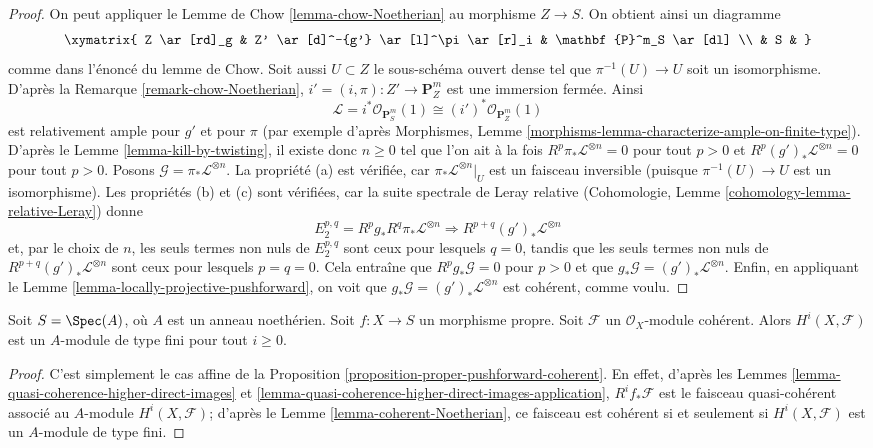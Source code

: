 \begin{proof}
\medskip\noindent
On peut appliquer le Lemme de Chow \ref{lemma-chow-Noetherian}
au morphisme $Z \to S$. On obtient ainsi un diagramme
$$
\xymatrix{
Z \ar[rd]_g & Z' \ar[d]^-{g'} \ar[l]^\pi \ar[r]_i & \mathbf{P}^m_S \ar[dl] \\
& S &
}
$$
comme dans l'énoncé du lemme de Chow. Soit aussi $U \subset Z$
le sous-schéma ouvert dense tel que $\pi^{-1}(U) \to U$ soit un isomorphisme.
D'après la Remarque \ref{remark-chow-Noetherian},
$i' = (i, \pi) : Z' \to \mathbf{P}^m_Z$ est
une immersion fermée. Ainsi
$$
\mathcal{L} = i^*\mathcal{O}_{\mathbf{P}^m_S}(1) \cong
(i')^*\mathcal{O}_{\mathbf{P}^m_Z}(1)
$$
est relativement ample pour $g'$ et pour $\pi$ (par exemple d'après
Morphismes, Lemme \ref{morphisms-lemma-characterize-ample-on-finite-type}).
D'après le Lemme \ref{lemma-kill-by-twisting},
il existe donc $n \geq 0$ tel que l'on ait
à la fois $R^p\pi_*\mathcal{L}^{\otimes n} = 0$ pour tout $p > 0$ et
$R^p(g')_*\mathcal{L}^{\otimes n} = 0$ pour tout $p > 0$.
Posons $\mathcal{G} = \pi_*\mathcal{L}^{\otimes n}$.
La propriété (a) est vérifiée, car $\pi_*\mathcal{L}^{\otimes n}|_U$ est
un faisceau inversible (puisque $\pi^{-1}(U) \to U$ est un isomorphisme).
Les propriétés (b) et (c) sont vérifiées, car la suite spectrale
de Leray relative
(Cohomologie, Lemme \ref{cohomology-lemma-relative-Leray})
donne
$$
E_2^{p, q} = R^pg_* R^q\pi_*\mathcal{L}^{\otimes n}
\Rightarrow
R^{p + q}(g')_*\mathcal{L}^{\otimes n}
$$
et, par le choix de $n$, les seuls termes non nuls de $E_2^{p, q}$ sont
ceux pour lesquels $q = 0$, tandis que les seuls termes non nuls de
$R^{p + q}(g')_*\mathcal{L}^{\otimes n}$ sont ceux pour lesquels $p = q = 0$.
Cela entraîne que $R^pg_*\mathcal{G} = 0$ pour $p > 0$
et que $g_*\mathcal{G} = (g')_*\mathcal{L}^{\otimes n}$.
Enfin, en appliquant le
Lemme \ref{lemma-locally-projective-pushforward},
on voit que $g_*\mathcal{G} = (g')_*\mathcal{L}^{\otimes n}$ est
cohérent, comme voulu.
\end{proof}

\begin{lemma}
\label{lemma-proper-over-affine-cohomology-finite}
Soit $S = \Spec(A)$, où $A$ est un anneau noethérien.
Soit $f : X \to S$ un morphisme propre.
Soit $\mathcal{F}$ un $\mathcal{O}_X$-module cohérent.
Alors $H^i(X, \mathcal{F})$ est un $A$-module de type fini pour tout $i \geq 0$.
\end{lemma}

\begin{proof}
C'est simplement le cas affine de la
Proposition \ref{proposition-proper-pushforward-coherent}.
En effet, d'après les Lemmes \ref{lemma-quasi-coherence-higher-direct-images} et
\ref{lemma-quasi-coherence-higher-direct-images-application},
$R^if_*\mathcal{F}$ est le faisceau quasi-cohérent associé
au $A$-module $H^i(X, \mathcal{F})$;
d'après le Lemme \ref{lemma-coherent-Noetherian},
ce faisceau est cohérent si et seulement si $H^i(X, \mathcal{F})$
est un $A$-module de type fini.
\end{proof}

